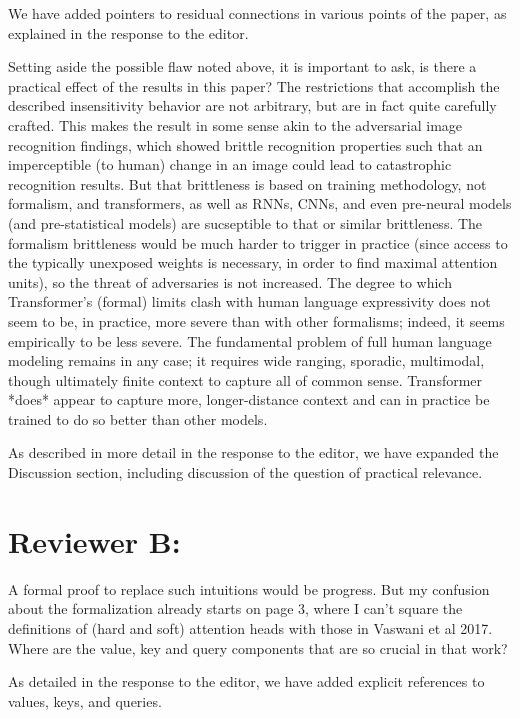\documentclass[11pt,a4paper]{article}
\newcommand\response[1]{{\color{blue}#1}}
\begin{document}
\response{We have added pointers to residual connections in various points of the paper, as explained in the response to the editor. }


Setting aside the possible flaw noted above, it is important to ask, is
there a practical effect of the results in this paper? The
restrictions that accomplish the described insensitivity behavior are
not arbitrary, but are in fact quite carefully crafted. This makes the
result in some sense akin to the adversarial image recognition
findings, which showed brittle recognition properties such that an
imperceptible (to human) change in an image could lead to
catastrophic recognition results. But that brittleness is based on
training methodology, not formalism, and transformers, as well as
RNNs, CNNs, and even pre-neural models (and pre-statistical models)
are sucseptible to that or similar brittleness. The formalism
brittleness would be much harder to trigger in practice (since access
to the typically unexposed weights is necessary, in order to find
maximal attention units), so the threat
of adversaries is not increased. The degree to which Transformer's
(formal) limits clash with human language expressivity does not seem
to be, in practice, more severe than with other formalisms; indeed, it
seems empirically to be less severe. The fundamental problem of full
human language modeling remains in any case; it requires wide ranging,
sporadic, multimodal, though ultimately finite context to capture all
of common sense. Transformer *does* appear to capture more,
longer-distance context and can in practice be trained to do so better
than other models.

\response{As described in more detail in the response to the editor, we have expanded the Discussion section, including discussion of the question of practical relevance.}

\section{Reviewer B:}


A formal proof to replace such intuitions would be progress. But my
confusion about the formalization already starts on page 3, where I can’t
square the definitions of (hard and soft) attention heads with those in
Vaswani et al 2017. Where are the value, key and query components that are
so crucial in that work?

\response{As detailed in the response to the editor, we have added explicit references to values, keys, and queries.}
\end{document}
